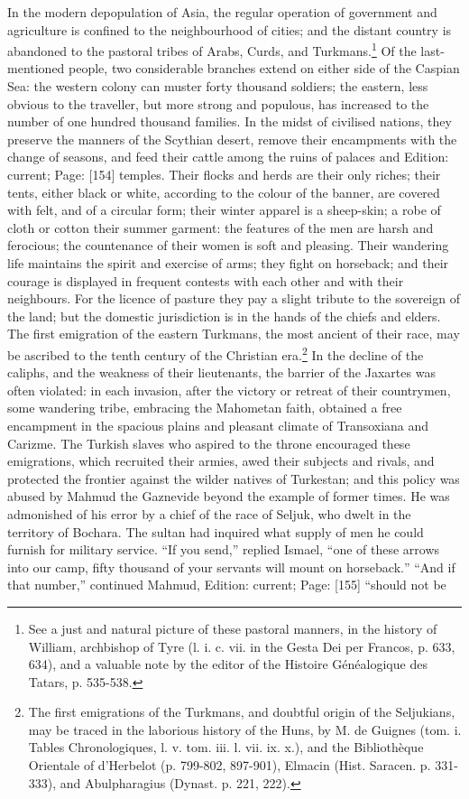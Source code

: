 In the modern depopulation of Asia, the regular operation of government and agriculture is confined to the neighbourhood of cities; and the distant country is abandoned to the pastoral tribes of Arabs, Curds, and Turkmans.\footnote{See a just and natural picture of these pastoral manners, in the history of William, archbishop of Tyre (l. i. c. vii. in the Gesta Dei per Francos, p. 633, 634), and a valuable note by the editor of the Histoire Généalogique des Tatars, p. 535-538.} Of the last-mentioned people, two considerable branches extend on either side of the Caspian Sea: the western colony can muster forty thousand soldiers; the eastern, less obvious to the traveller, but more strong and populous, has increased to the number of one hundred thousand families. In the midst of civilised nations, they preserve the manners of the Scythian desert, remove their encampments with the change of seasons, and feed their cattle among the ruins of palaces and Edition: current; Page: [154] temples. Their flocks and herds are their only riches; their tents, either black or white, according to the colour of the banner, are covered with felt, and of a circular form; their winter apparel is a sheep-skin; a robe of cloth or cotton their summer garment: the features of the men are harsh and ferocious; the countenance of their women is soft and pleasing. Their wandering life maintains the spirit and exercise of arms; they fight on horseback; and their courage is displayed in frequent contests with each other and with their neighbours. For the licence of pasture they pay a slight tribute to the sovereign of the land; but the domestic jurisdiction is in the hands of the chiefs and elders. The first emigration of the eastern Turkmans, the most ancient of their race, may be ascribed to the tenth century of the Christian era.\footnote{The first emigrations of the Turkmans, and doubtful origin of the Seljukians, may be traced in the laborious history of the Huns, by M. de Guignes (tom. i. Tables Chronologiques, l. v. tom. iii. l. vii. ix. x.), and the Bibliothèque Orientale of d\texthebrew{}’Herbelot (p. 799-802, 897-901), Elmacin (Hist. Saracen. p. 331-333), and Abulpharagius (Dynast. p. 221, 222).} In the decline of the caliphs, and the weakness of their lieutenants, the barrier of the Jaxartes was often violated: in each invasion, after the victory or retreat of their countrymen, some wandering tribe, embracing the Mahometan faith, obtained a free encampment in the spacious plains and pleasant climate of Transoxiana and Carizme. The Turkish slaves who aspired to the throne encouraged these emigrations, which recruited their armies, awed their subjects and rivals, and protected the frontier against the wilder natives of Turkestan; and this policy was abused by Mahmud the Gaznevide beyond the example of former times. He was admonished of his error by a chief of the race of Seljuk, who dwelt in the territory of Bochara. The sultan had inquired what supply of men he could furnish for military service. \texthebrew{“}If you send,\texthebrew{}” replied Ismael, \texthebrew{“}one of these arrows into our camp, fifty thousand of your servants will mount on horseback.\texthebrew{” “}And if that number,\texthebrew{}” continued Mahmud, Edition: current; Page: [155] \texthebrew{“}should not be 